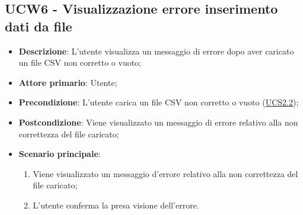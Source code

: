 \subsection{UCW6 - Visualizzazione errore inserimento dati da file}
\label{sub:ucw6}
\begin{itemize}
    \item \textbf{Descrizione}: L'utente visualizza un messaggio di errore dopo aver caricato un file CSV non corretto 
    o vuoto;

    \item \textbf{Attore primario}: Utente;
    
    \item \textbf{Precondizione}:   L'utente carica un file CSV non corretto o vuoto (\hyperref[ssub:ucs2.2]{UCS2.2});

    \item \textbf{Postcondizione}:  Viene visualizzato un messaggio di errore relativo alla non correttezza del file 
    caricato;

    \item \textbf{Scenario principale}:
    \begin{enumerate}
        \item Viene visualizzato un messaggio d'errore relativo alla non correttezza del file caricato;
        \item L'utente conferma la presa visione dell'errore.
    \end{enumerate}

\end{itemize}